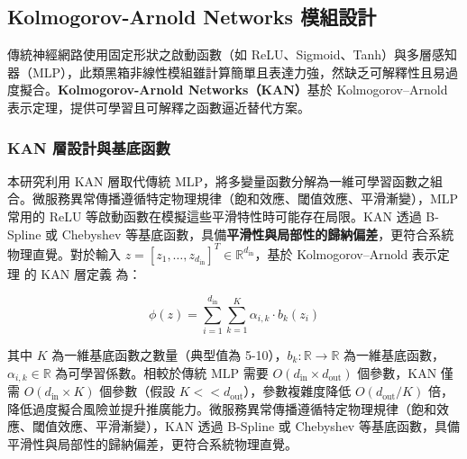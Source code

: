 \documentclass[10pt,a4paper,twocolumn]{article}
\begin{document}
\subsection{Kolmogorov-Arnold Networks 模組設計}

傳統神經網路使用固定形狀之啟動函數（如 ReLU、Sigmoid、Tanh）與多層感知器（MLP），此類黑箱非線性模組雖計算簡單且表達力強，然缺乏可解釋性且易過度擬合。\textbf{Kolmogorov-Arnold Networks（KAN）}基於 Kolmogorov–Arnold 表示定理，提供可學習且可解釋之函數逼近替代方案。

\subsubsection{KAN 層設計與基底函數}

本研究利用 KAN 層取代傳統 MLP，將多變量函數分解為一維可學習函數之組合。微服務異常傳播遵循特定物理規律（飽和效應、閾值效應、平滑漸變），MLP 常用的 ReLU 等啟動函數在模擬這些平滑特性時可能存在局限。KAN 透過 B-Spline 或 Chebyshev 等基底函數，具備\textbf{平滑性與局部性的歸納偏差}，更符合系統物理直覺。對於輸入 $z = [z_1, \ldots, z_{d_{\text{in}}}]^T \in \mathbb{R}^{d_{\text{in}}}$，基於 Kolmogorov–Arnold 表示定理 \cite{kolmogorov1957} 的 KAN 層定義 \cite{kan2024} 為：

\begin{equation}
\phi(z) = \sum_{i=1}^{d_{\text{in}}} \sum_{k=1}^{K} \alpha_{i,k} \cdot b_k(z_i)
\end{equation}

其中 $K$ 為一維基底函數之數量（典型值為 5-10），$b_k: \mathbb{R} \to \mathbb{R}$ 為一維基底函數，$\alpha_{i,k} \in \mathbb{R}$ 為可學習係數。相較於傳統 MLP 需要 $O(d_{\text{in}} \times d_{\text{out}})$ 個參數，KAN 僅需 $O(d_{\text{in}} \times K)$ 個參數（假設 $K << d_{\text{out}}$），參數複雜度降低 $O(d_{\text{out}}/K)$ 倍，降低過度擬合風險並提升推廣能力。微服務異常傳播遵循特定物理規律（飽和效應、閾值效應、平滑漸變），KAN 透過 B-Spline 或 Chebyshev 等基底函數，具備平滑性與局部性的歸納偏差，更符合系統物理直覺。
\end{document}

